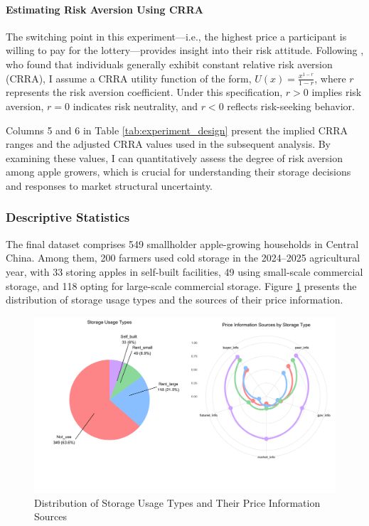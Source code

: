 \documentclass[12pt]{article}
\begin{document}
\paragraph{Estimating Risk Aversion Using CRRA}
The switching point in this experiment—i.e., the highest price a participant is willing to pay for the lottery—provides insight into their risk attitude. Following \cite{chiappori2011relative}, who found that individuals generally exhibit constant relative risk aversion (CRRA), I assume a CRRA utility function of the form, $U(x) = \frac{x^{1-r}}{1 - r}$, where \(r\) represents the risk aversion coefficient. Under this specification, \(r > 0\) implies risk aversion, \(r = 0\) indicates risk neutrality, and \(r < 0\) reflects risk-seeking behavior.

Columns 5 and 6 in Table \ref{tab:experiment_design} present the implied CRRA ranges and the adjusted CRRA values used in the subsequent analysis. By examining these values, I can quantitatively assess the degree of risk aversion among apple growers, which is crucial for understanding their storage decisions and responses to market structural uncertainty.


\subsubsection{Descriptive Statistics}
\noindent The final dataset comprises 549 smallholder apple-growing households in Central China. Among them, 200 farmers used cold storage in the 2024–2025 agricultural year, with 33 storing apples in self-built facilities, 49 using small-scale commercial storage, and 118 opting for large-scale commercial storage. Figure \ref{Figure: pie and radar chart} presents the distribution of storage usage types and the sources of their price information. 

\begin{figure}[htp]
\centering
\includegraphics[width=1\textwidth]{figures/storage_usage_analysis_soft_colors.png}
\caption{Distribution of Storage Usage Types and Their Price Information Sources}
\label{Figure: pie and radar chart}
\end{figure}
\end{document}

